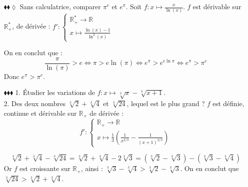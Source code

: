 \documentclass[11pt]{article}
\begin{document}
\begin{exercice}{$\blacklozenge\blacklozenge\lozenge$}{}
    Sans calculatrice, comparer $\pi^e$ et $e^\pi$.
    \tcblower
    Soit $f:x\mapsto\frac{x}{\ln(x)}$. $f$ est dérivable sur $\mathbb{R}^*_+$, de dérivée : $f':\begin{cases}\mathbb{R}^*_+\rightarrow\mathbb{R}\\x\mapsto\frac{\ln(x)-1}{\ln^2(x)}\end{cases}$
    \begin{center}
    \end{center}
    On en conclut que :
    \begin{equation*}
        \frac{\pi}{\ln(\pi)}>e \iff \pi>e\ln(\pi)\iff e^\pi>e^{e\ln{\pi}}\iff e^\pi>\pi^e
    \end{equation*}
    Donc $e^\pi>\pi^e$.
\end{exercice}

\begin{exercice}{$\blacklozenge\blacklozenge\blacklozenge$}{}
    1. Étudier les variations de $f:x\mapsto\sqrt[3]{x}-\sqrt[3]{x+1}$.\\
    2. Des deux nombres $\sqrt[3]{2}+\sqrt[3]{4}$ et $\sqrt[3]{24}$, lequel est le plus grand ?
    \tcblower
     $f$ est définie, continue et dérivable sur $\mathbb{R}_+$ de dérivée :
    \begin{equation*}
        f':\begin{cases}\mathbb{R}_+\rightarrow\mathbb{R}\\x\mapsto \frac{1}{3}\left(\frac{1}{x^{2/3}}-\frac{1}{(x+1)^{2/3}}\right)\end{cases}
    \end{equation*}
    \begin{center}
    \end{center}
    \begin{equation*}
        \sqrt[3]{2}+\sqrt[3]{4}-\sqrt[3]{24}=\sqrt[3]{2}+\sqrt[3]{4}-2\sqrt[3]{3}=(\sqrt[3]{2}-\sqrt[3]{3})-(\sqrt[3]{3}-\sqrt[3]{4})
    \end{equation*}
    Or $f$ est croissante sur $\mathbb{R}_+$, ainsi : $\sqrt[3]{3}-\sqrt[3]{4}>\sqrt[3]{2}-\sqrt[3]{3}$.
    On en conclut que $\sqrt[3]{24}>\sqrt[3]{2}+\sqrt[3]{4} $.
\end{exercice}
\end{document}
